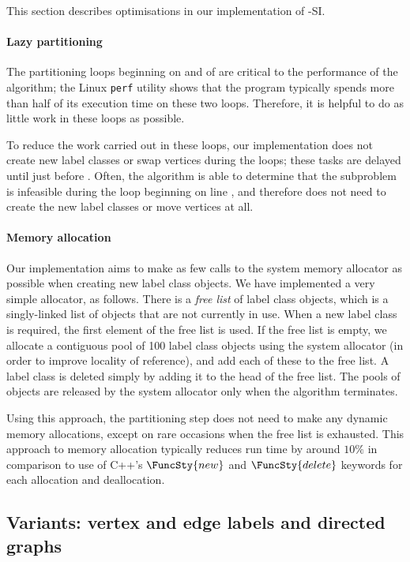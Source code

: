 This section describes optimisations in our implementation of \McSplit-SI.

\paragraph{Lazy partitioning}
The partitioning loops beginning on 
and  of  are critical to
the performance of the algorithm; the Linux \texttt{perf} utility shows
that the program typically spends more than half of its execution time
on these two loops.  Therefore, it is helpful to do as little work in these
loops as possible.

To reduce the work carried out in these loops, our implementation does
not create new label classes or swap vertices during the loops; these
tasks are delayed until just before .
Often, the algorithm is able to determine that the subproblem
is infeasible during the loop beginning on line
, and therefore does
not need to create the new label classes or move vertices at all.

\paragraph{Memory allocation}
Our implementation aims to make as few calls to the system memory allocator as possible when creating
new label class objects.  We have implemented a very simple allocator, as follows.  There is a \emph{free list}
of label class objects, which is a singly-linked list of objects that are not currently in use.  When
a new label class is required, the first element of the free list is used.  If the free list is empty,
we allocate a contiguous pool of 100 label class objects using the system allocator (in order to improve
locality of reference), and add each of these to the free list.  A label class is deleted simply by
adding it to the head of the free list.  The pools of objects are released by the system allocator only when
the algorithm terminates.

Using this approach, the partitioning step does not need to make any dynamic memory allocations, except
on rare occasions when the free list is exhausted.
This approach to memory allocation typically reduces run time by around $10\%$ in comparison to use of
C++'s $\FuncSty{new}$ and $\FuncSty{delete}$ keywords for each allocation and deallocation.

\subsection{Variants: vertex and edge labels and directed graphs}

